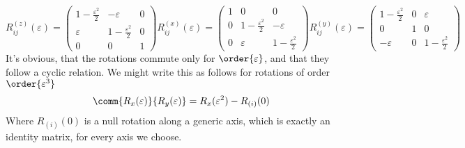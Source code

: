 \documentclass[a4paper, 11pt]{book}
\newcommand{\1}{\opr{\mathds{1}}}
\theoremstyle{plain}
\begin{document}
	\begin{subequations}
	\begin{equation}
		R_{ij}^{(z)}(\varepsilon)=\begin{pmatrix}
			1-\frac{\varepsilon^2}{2}&-\varepsilon&0\\
			\varepsilon&1-\frac{\varepsilon^2}{2}&0\\
			0&0&1
		\end{pmatrix}
		\label{eq:infrotmatrixz}
	\end{equation}
	\begin{equation}
		R_{ij}^{(x)}(\varepsilon)=\begin{pmatrix}
			1&0&0\\
			0&1-\frac{\varepsilon^2}{2}&-\varepsilon\\
			0&\varepsilon&1-\frac{\varepsilon^2}{2}
		\end{pmatrix}
		\label{eq:infrotmatrixx}
	\end{equation}
	\begin{equation}
		R_{ij}^{(y)}(\varepsilon)=\begin{pmatrix}
			1-\frac{\varepsilon^2}{2}&0&\varepsilon\\
			0&1&0\\
			-\varepsilon&0&1-\frac{\varepsilon^2}{2}
		\end{pmatrix}
		\label{eq:infrotmatrixy}
	\end{equation}
\end{subequations}
	It's obvious, that the rotations commute only for $\order{\varepsilon}$, and that they follow a cyclic relation. We might write this as follows for rotations of order $\order{\varepsilon^3}$\\
	\begin{equation}
		\comm{R_x(\varepsilon)}{R_y(\varepsilon)}=R_x(\varepsilon^2)-R_{(i)}(0)
		\label{eq:rotationcommutationrel}
	\end{equation}
	Where $R_{(i)}(0)$ is a null rotation along a generic axis, which is exactly an identity matrix, for every axis we choose.
\end{document}
